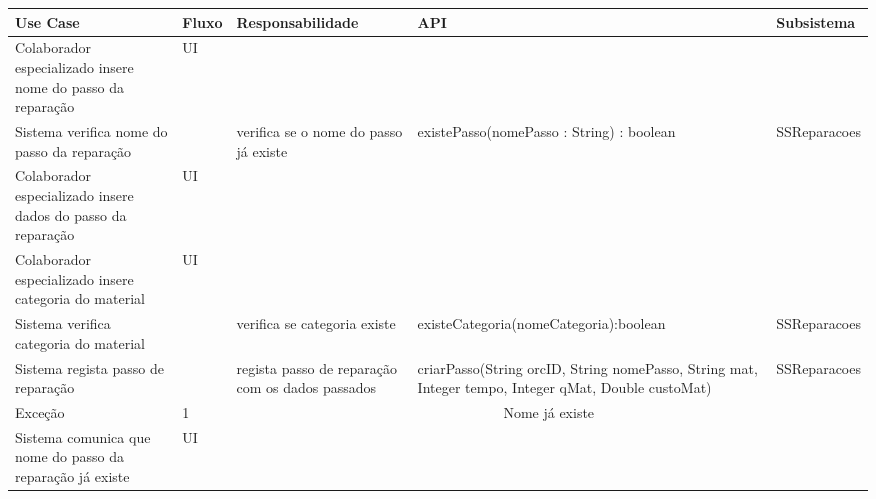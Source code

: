 \documentclass[../relatorio.tex]{subfiles}
\begin{document}
\begin{landscape}
    \begin{table}[!h]
        \centering
        \begin{tabular}{|p{5cm}|p{1cm}|p{4cm}|p{6cm}|p{3cm}|}
            \hline
            \rowcolor{gray!20!white}
            Use Case & Fluxo                                            & Responsabilidade & API & Subsistema \\
            \hline
            \rowcolor{yellow}
            Colaborador especializado insere nome do passo da reparação
                     & UI
                     & 
                     & 
                     & 
            \\
            \hline
            Sistema verifica nome do passo da reparação
                     & 
                     & verifica se o nome do passo já existe
                     & existePasso(nomePasso : String) : boolean
                     & SSReparacoes
            \\
            \hline
            \rowcolor{yellow}
            Colaborador especializado insere dados do passo da reparação
                     & UI
                     & 
                     & 
                     & 
            \\
            \hline
            \rowcolor{yellow}
            Colaborador especializado insere categoria do material
                     & UI
                     & 
                     & 
                     & 
            \\
            \hline
            Sistema verifica categoria do material
                     & 
                     & verifica se categoria existe
                     & existeCategoria(nomeCategoria):boolean
                     & SSReparacoes
            \\
            \hline
            Sistema regista passo de reparação
                     & 
                     & regista passo de reparação com os dados passados
                     & criarPasso(String orcID, String nomePasso, String mat, Integer tempo, Integer qMat, Double custoMat)
                     & SSReparacoes
            \\
            \hline
            \rowcolor{red!30}
            Exceção  & 1                                                 &  \multicolumn{3}{c}{Nome já existe}\\
            \hline
            \rowcolor{yellow}
            Sistema comunica que nome do passo da reparação já existe
                     & UI

\end{tabular}
\end{table}
\end{landscape}
\end{document}
